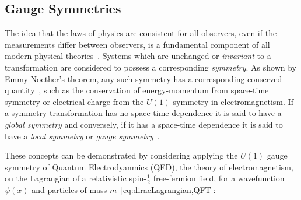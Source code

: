 \begin{table}[htbp]
\label{tab:bosons}
  \centering
\end{table}	

\subsection{Gauge Symmetries}\label{subsec:gaugeSymmetries}
The idea that the laws of physics are consistent for all observers, even if the measurements differ between observers, is a fundamental component of all modern physical theories~\cite{Haywood}.
Systems which are unchanged or \emph{invariant} to a transformation are considered to possess a corresponding \emph{symmetry}.
As shown by Emmy Noether's theorem, any such symmetry has a corresponding conserved quantity~\cite{Noether:1918zz}, such as the conservation of energy-momentum from space-time symmetry or electrical charge from the $U(1)$ symmetry in electromagnetism.
If a symmetry transformation has no space-time dependence it is said to have a \emph{global symmetry} and conversely, if it has a space-time dependence it is said to have a \emph{local symmetry} or \emph{gauge symmetry}~\cite{Cheng:1985bj}.

These concepts can be demonstrated by considering applying the $U(1)$ gauge symmetry of Quantum Electrodyanmics (QED), the theory of electromagnetism, on the Lagrangian of a relativistic spin-$\frac{1}{2}$ free-fermion field, for a wavefunction $\psi(x)$ and particles of mass $m$~\ref{eq:diracLagrangian,QFT}:

